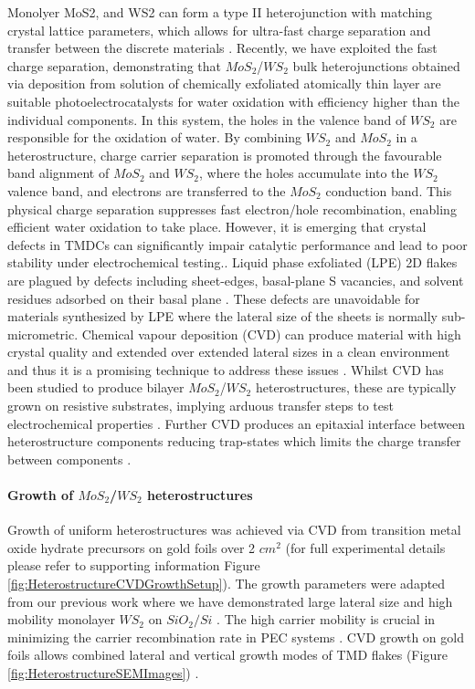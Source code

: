 Monolyer MoS2, and WS2 can form a type II heterojunction with matching crystal lattice parameters, which allows for ultra-fast charge separation and transfer between the discrete materials \cite{Chen2016}\cite{Wang2013}. Recently, we have exploited the fast charge separation, demonstrating that $MoS_2$/$WS_2$ bulk heterojunctions obtained via deposition from solution of chemically exfoliated atomically thin layer  are suitable photoelectrocatalysts for water oxidation \cite{Pesci2017} with efficiency higher than the individual components. In this system, the holes in the valence band of $WS_2$ are responsible for the oxidation of water. By combining $WS_2$ and $MoS_2$ in a heterostructure, charge carrier separation is promoted through the favourable band alignment of $MoS_2$ and $WS_2$, where the holes accumulate into the $WS_2$ valence band, and electrons are transferred to the $MoS_2$ conduction band. This physical charge separation suppresses fast electron/hole recombination, enabling efficient water oxidation to take place.
However, it is emerging that crystal defects in TMDCs can significantly impair catalytic performance and lead to poor stability under electrochemical testing.\cite{Yu2017}\cite{Voiry2016}\cite{Parzinger2015}\cite{Yu2017a}\cite{Raza2016}. Liquid phase exfoliated (LPE) 2D flakes are plagued by defects including sheet-edges, basal-plane S vacancies, and solvent residues adsorbed on their basal plane \cite{Yu2017}\cite{Yu2016}\cite{Sivula2016}. These defects are unavoidable for materials synthesized by LPE where the lateral size of the sheets is normally sub-micrometric. Chemical vapour deposition (CVD) can produce material with high crystal quality and extended over extended lateral sizes in a clean environment and thus it is a promising technique to address these issues \cite{Reale2017}. Whilst CVD has been studied to produce bilayer $MoS_2$/$WS_2$ heterostructures, these are typically grown on resistive substrates, implying arduous transfer steps to test electrochemical properties \cite{Chen2015}. Further CVD produces an epitaxial interface between heterostructure components reducing trap-states which limits the charge transfer between components \cite{Tan2018}.
 
\paragraph{Growth of $MoS_2$/$WS_2$ heterostructures}

Growth of uniform heterostructures was achieved via CVD from transition metal oxide hydrate precursors on gold foils over 2 $cm^2$ (for full experimental details please refer to supporting information Figure \ref{fig:HeterostructureCVDGrowthSetup}). The growth parameters were adapted from our previous work where we have demonstrated large lateral size and high mobility monolayer $WS_2$ on $SiO_2/Si$ \cite{Reale2017}. The high carrier mobility is crucial in minimizing the carrier recombination rate in PEC systems \cite{Li2015a}. CVD growth on gold foils allows combined lateral and vertical growth modes of TMD flakes (Figure \ref{fig:HeterostructureSEMImages}) \cite{Shi2014}.

